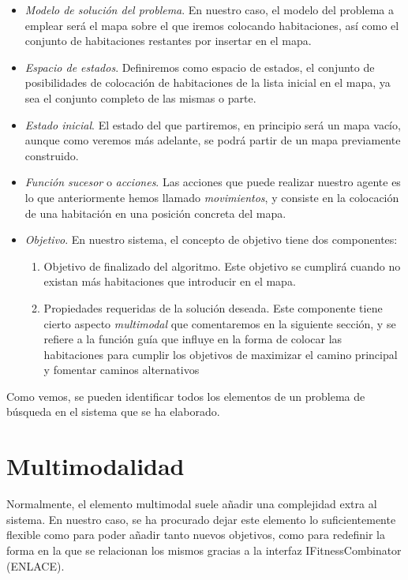 \begin{itemize}
	\item \emph{Modelo de solución del problema}. En nuestro caso, el modelo del problema a emplear será el mapa sobre el que iremos colocando habitaciones, así como el conjunto de habitaciones restantes por insertar en el mapa.
	\item \emph{Espacio de estados}. Definiremos como espacio de estados, el conjunto de posibilidades de colocación de habitaciones de la lista inicial en el mapa, ya sea el conjunto completo de las mismas o parte.
	\item \emph{Estado inicial}. El estado del que partiremos, en principio será un mapa vacío, aunque como veremos más adelante, se podrá partir de un mapa previamente construido.
	\item \emph{Función sucesor} o \emph{acciones}. Las acciones que puede realizar nuestro agente es lo que anteriormente hemos llamado \emph{movimientos}, y consiste en la colocación de una habitación en una posición concreta del mapa.
	\item \emph{Objetivo}. En nuestro sistema, el concepto de objetivo tiene dos componentes:
		\begin{enumerate}
			\item Objetivo de finalizado del algoritmo. Este objetivo se cumplirá cuando no existan más habitaciones que introducir en el mapa.
			\item Propiedades requeridas de la solución deseada. Este componente tiene cierto aspecto \emph{multimodal} que comentaremos en la siguiente sección, y se refiere a la función guía que influye en la forma de colocar las habitaciones para cumplir los objetivos de maximizar el camino principal y fomentar caminos alternativos
		\end{enumerate}
\end{itemize}

Como vemos, se pueden identificar todos los elementos de un problema de búsqueda en el sistema que se ha elaborado.


\section{Multimodalidad}

Normalmente, el elemento multimodal suele añadir una complejidad extra al sistema. En nuestro caso, se ha procurado dejar este elemento lo suficientemente flexible como para poder añadir tanto nuevos objetivos, como para redefinir la forma en la que se relacionan los mismos gracias a la interfaz IFitnessCombinator (ENLACE).

